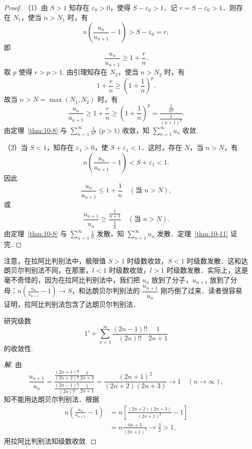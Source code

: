 \begin{proof}
（1）由 $S>1$ 知存在 $\varepsilon_{0}>0$，使得 $S-\varepsilon_{0}>1$．记 $r=S-\varepsilon_{0}>1$．则存在 $N_{1}$，使当 $n>N_{1}$ 时，有
\[
n\left(\frac{u_{n}}{u_{n+1}}-1\right)>S-\varepsilon_{0}=r,
\]
即
\[
\frac{u_{n}}{u_{n+1}}\geqslant1+\frac{r}{n}.
\]
取 $p$ 使得 $r>p>1$. 由引理知存在 $N_{2}$，使当 $n>N_{2}$ 时，有
\[
1+\frac{r}{n}\geqslant\left(1+\frac{1}{n}\right)^{p}.
\]
故当 $n>N=\max(N_1,N_2)$ 时，有
\[
\frac{u_{n}}{u_{n+1}}\geqslant1+\frac{r}{n}\geqslant\left(1+\frac{1}{n}\right)^{p}=\frac{\frac{1}{n^{p}}}{\frac{1}{(n+1)^{p}}}.
\]
由定理~\ref{thm:10-8} 与 $\sum_{n=1}^{\infty}\frac{1}{n^{p}}$ ($p>1$) 收敛，知 $\sum_{n=1}^{\infty}u_{n}$ 收敛.

（2）当 $S<1$，知存在 $\varepsilon_{1}>0$，使 $S+\varepsilon_{1}<1$．这时，存在 $N$，当 $n>N$，有
\[
n\left(\frac{u_{n}}{u_{n+1}}-1\right)<S+\varepsilon_{1}<1.
\]
因此
\[
\frac{u_{n}}{u_{n+1}}\leqslant1+\frac{1}{n}\quad(\text{当 }n>N),
\]
或
\[
\frac{u_{n+1}}{u_{n}}\geqslant\frac{\frac{1}{n+1}}{\frac{1}{n}}\quad(\text{当 }n>N).
\]
由定理~\ref{thm:10-8} 与 $\sum_{n=1}^{\infty}\frac{1}{n}$ 发散，知 $\sum_{n=1}^{\infty}u_{n}$ 发散．定理~\ref{thm:10-11} 证完.
\end{proof}

注意，在拉阿比判别法中，极限值 $S>1$ 时级数收敛，$S<1$ 时级数发散．这和达朗贝尔判别法不同，在那里，$l<1$ 时级数收敛，$l>1$ 时级数发散．实际上，这是毫不奇怪的，因为在拉阿比判别法中，我们把 $u_{n}$ 放到了分子，$u_{n+1}$ 放到了分母：$n\left(\frac{u_{n}}{u_{n+1}}-1\right)\to S$，和达朗贝尔判别法的 $\dfrac{u_{n+1}}{u_{n}}$ 刚巧倒了过来．读者很容易证明，拉阿比判别法包含了达朗贝尔判别法．

\begin{example}\label{ex:10-3-7}
研究级数
\[
1'+\sum_{n=1}^{\infty}\frac{(2n-1)!!}{(2n)!!}\frac{1}{2n+1}
\]
的收敛性.
\end{example}

\begin{proof}[解]
由
\[
\frac{u_{n+1}}{u_{n}}=\frac{\frac{(2n+1)!!}{(2n+2)!!}\frac{1}{2n+3}}{\frac{(2n-1)!!}{(2n)!!}\frac{1}{2n+1}}=\frac{(2n+1)^{2}}{(2n+2)(2n+3)}\to1\quad(n\to\infty),
\]
知不能用达朗贝尔判别法．根据
\[
\begin{aligned}
n\left(\frac{u_{n}}{u_{n+1}}-1\right)&=n\left[\frac{(2n+2)(2n+3)}{(2n+1)^{2}}-1\right]\\
&=n\frac{6n+5}{(2n+1)^{2}}\to\frac{3}{2}>1,
\end{aligned}
\]
用拉阿比判别法知级数收敛.
\end{proof}

